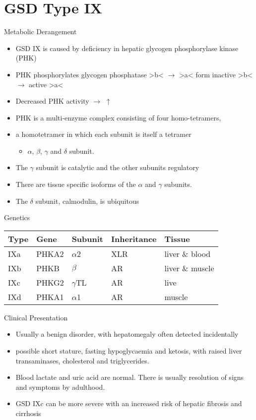 \documentclass[presentation, smaller]{beamer}
\begin{document}
\section{GSD Type IX}
\label{sec:orgc024bbf}
\begin{frame}[label={sec:org5c76ace}]{Metabolic Derangement}
\begin{itemize}
\item GSD IX is caused by deficiency in hepatic glycogen phosphorylase kinase (PHK)
\item PHK phosphorylates glycogen phosphatase >b< \(\to\) >a< form
inactive >b< \(\to\)  active >a<
\item Decreased PHK activity \(\to\) \(\uparrow\)
\item PHK is a multi-enzyme complex consisting of four homo-tetramers,
\item a homotetramer in which each subunit is itself a tetramer
\begin{itemize}
\item \(\alpha\), \(\beta\), \(\gamma\) and \(\delta\) subunit.
\end{itemize}
\item The \(\gamma\) subunit is catalytic and the other subunits regulatory
\item There are tissue specific isoforms of the \(\alpha\) and \(\gamma\) subunits.
\item The \(\delta\) subunit, calmodulin, is ubiquitous
\end{itemize}
\end{frame}

\begin{frame}[label={sec:orgba78cc5}]{Genetics}
\begin{center}
\begin{tabular}{lllll}
Type & Gene & Subunit & Inheritance & Tissue\\
\hline
IXa & PHKA2 & \(\alpha\)2 & XLR & liver \& blood\\
IXb & PHKB & \(\beta\) & AR & liver \& muscle\\
IXc & PHKG2 & \(\gamma\)TL & AR & live\\
IXd & PHKA1 & \(\alpha\)1 & AR & muscle\\
\end{tabular}
\end{center}
\end{frame}

\begin{frame}[label={sec:orgb23f134}]{Clinical Presentation}
\begin{itemize}
\item Usually a benign disorder, with hepatomegaly often detected
incidentally
\item possible short stature, fasting hypoglycaemia and ketosis, with
raised liver transaminases, cholesterol and triglycerides.
\item Blood lactate and uric acid are normal. There is usually resolution
of signs and symptoms by adulthood.
\item GSD IXc can be more severe with an increased risk of hepatic fibrosis and cirrhosis
\end{itemize}
\end{frame}
\end{document}
